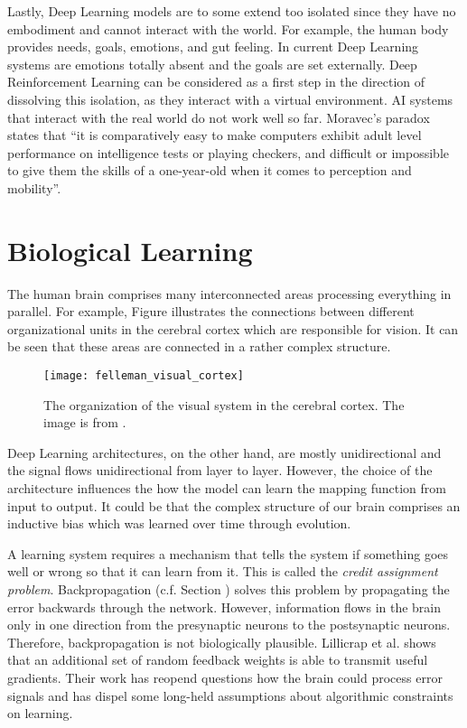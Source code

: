 Lastly, Deep Learning models are to some extend too isolated since they have no embodiment and cannot interact with the world.
For example, the human body provides needs, goals, emotions, and gut feeling.
In current Deep Learning systems are emotions totally absent and the goals are set externally.
Deep Reinforcement Learning can be considered as a first step in the direction of dissolving this isolation, as they interact with a virtual environment. 
AI systems that interact with the real world do not work well so far.
Moravec's paradox  states that ``it is comparatively easy to make computers exhibit adult level performance on intelligence tests or playing checkers, and difficult or impossible to give them the skills of a one-year-old when it comes to perception and mobility''.


\section{Biological Learning}
The human brain comprises many interconnected areas processing everything in parallel.
For example, Figure  illustrates the connections between different organizational units in the cerebral cortex which are responsible for vision.
It can be seen that these areas are connected in a rather complex structure.
\begin{figure}[h]
    \centering
    \texttt{[image: felleman\_visual\_cortex]}
    \caption[Organization of the visual system in the cerebral cortex]{The organization of the visual system in the cerebral cortex. The image is from .}
\end{figure}
Deep Learning architectures, on the other hand, are mostly unidirectional and the signal flows unidirectional from layer to layer.
However, the choice of the architecture influences the how the model can learn the mapping function from input to output.
It could be that the complex structure of our brain comprises an inductive bias which was learned over time through evolution.

A learning system requires a mechanism that tells the system if something goes well or wrong so that it can learn from it.
This is called the \emph{credit assignment problem}.
Backpropagation (c.f. Section ) solves this problem by propagating the error backwards through the network.
However, information flows in the brain only in one direction from the presynaptic neurons to the postsynaptic neurons.
Therefore, backpropagation is not biologically plausible.
Lillicrap et al.  shows that an additional set of random feedback weights is able to transmit useful gradients.
Their work has reopend questions how the brain could process error signals and has dispel some long-held assumptions about algorithmic constraints on learning.

